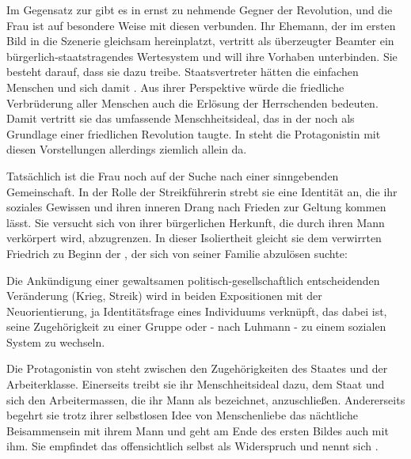 Im Gegensatz zur  gibt es in 
ernst zu nehmende Gegner der Revolution, und die Frau ist auf besondere Weise
mit diesen verbunden. Ihr Ehemann, der im ersten Bild in die Szenerie gleichsam
hereinplatzt, vertritt als überzeugter Beamter ein bürgerlich-staatstragendes
Wertesystem und will ihre Vorhaben unterbinden. Sie besteht darauf, dass
\Cite{Not aus Menschsein}  sie dazu treibe. Staatsvertreter
hätten die einfachen Menschen \Cite{erniedrigt} und sich damit \Cite{selbst
  geschändet} .
Aus ihrer Perspektive würde die friedliche
Verbrüderung aller Menschen auch die Erlösung der Herrschenden bedeuten. Damit
vertritt sie das umfassende Menschheitsideal, das in der  noch als
Grundlage einer friedlichen Revolution taugte. In 
steht die Protagonistin mit diesen Vorstellungen allerdings ziemlich
allein da.

Tatsächlich ist die Frau noch auf der Suche nach einer sinngebenden
Gemeinschaft. In der Rolle der Streikführerin strebt sie eine Identität an,
die ihr soziales Gewissen und ihren inneren Drang nach Frieden zur Geltung
kommen lässt. Sie versucht sich von ihrer bürgerlichen Herkunft, die
durch ihren Mann verkörpert wird, abzugrenzen. In dieser Isoliertheit gleicht
sie dem verwirrten Friedrich zu Beginn der , der sich von
seiner Familie abzulösen suchte:

\begin{BlockQuote}
Die Ankündigung einer gewaltsamen politisch-gesellschaftlich entscheidenden
Veränderung (Krieg, Streik) wird in beiden Expositionen mit der
Neuorientierung, ja Identitätsfrage eines Individuums verknüpft, das dabei
ist, seine Zugehörigkeit zu einer Gruppe oder - nach Luhmann - zu einem
sozialen System zu wechseln.
\end{BlockQuote}
Die Protagonistin von  steht zwischen den
Zugehörigkeiten des Staates und der Arbeiterklasse. Einerseits treibt sie ihr
Menschheitsideal dazu, dem Staat \Cite{die Maske von der Mörderfratze zu
  reißen} 
und sich den Arbeitermassen, die ihr Mann als \Cite{innren Feind}
 bezeichnet, 
anzuschließen. Andererseits begehrt sie trotz ihrer selbstlosen Idee
von Menschenliebe das nächtliche Beisammensein mit ihrem Mann und geht am
Ende des ersten Bildes auch mit ihm. Sie empfindet das offensichtlich selbst als
Widerspruch und nennt sich \Cite{schamlos in meinem Blut} .

